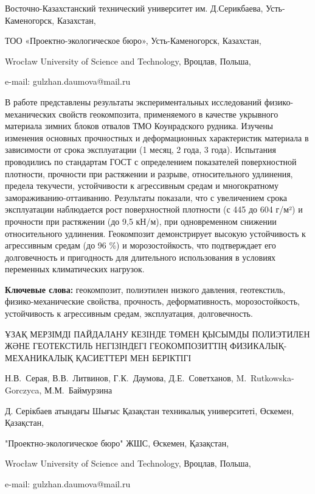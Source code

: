 \begin{affil}
Восточно-Казахстанский технический университет им. Д.Серикбаева, Усть-Каменогорск, Казахстан,

ТОО «Проектно-экологическое бюро», Усть-Каменогорск, Казахстан,

Wrocław University of Science and Technology, Вроцлав, Польша,

e-mail: gulzhan.daumova@mail.ru
\end{affil}

В работе представлены результаты экспериментальных исследований
физико-механических сво\-йств геокомпозита, применяемого в качестве
укрывного материала зимних блоков отвалов ТМО Коунрадского рудника.
Изучены изменения основных прочностных и деформационных характеристик
материала в зависимости от срока эксплуатации (1 месяц, 2 года, 3 года).
Испытания проводились по стандартам ГОСТ с определением показателей
поверхностной плотности, прочности при растяжении и разрыве,
относительного удлинения, предела текучести, устойчивости к агрессивным
средам и многократному замораживанию-оттаиванию. Результаты показали,
что с увеличением срока эксплуатации наблюдается рост поверхностной
плотности (с 445 до 604 г/м²) и прочности при растяжении (до 9,5 кН/м),
при одновременном снижении относительного удлинения. Геокомпозит
демонстрирует высокую устойчивость к агрессивным средам (до 96 \%) и
морозостойкость, что подтверждает его долговечность и пригодность для
длительного использования в условиях переменных климатических нагрузок.

{\bfseries Ключевые слова:} геокомпозит, полиэтилен низкого давления,
геотекстиль, физико-механичес\-кие свойства, прочность, деформативность,
морозостойкость, устойчивость к агрессивным средам, эксплуатация,
долговечность.

\begin{header}
ҰЗАҚ МЕРЗІМДІ ПАЙДАЛАНУ КЕЗІНДЕ ТӨМЕН ҚЫСЫМДЫ ПОЛИЭТИЛЕН ЖӘНЕ ГЕОТЕКСТИЛЬ НЕГІЗІНДЕГІ ГЕОКОМПОЗИТТІҢ ФИЗИКАЛЫҚ-МЕХАНИКАЛЫҚ ҚАСИЕТТЕРІ МЕН БЕРІКТІГІ

Н.В.~Серая,
В.В.~Литвинов,
Г.К.~Даумова\envelope,
Д.Е.~Советханов,
M.~Rutkowska-Gorczyca,
М.М.~Баймурзина
\end{header}

\begin{affil}
Д. Серікбаев атындағы Шығыс Қазақстан техникалық университеті, Өскемен, Қазақстан,

"Проектно-экологическое бюро" ЖШС, Өскемен, Қазақстан,

Wrocław University of Science and Technology, Вроцлав, Польша,

e-mail: gulzhan.daumova@mail.ru
\end{affil}

